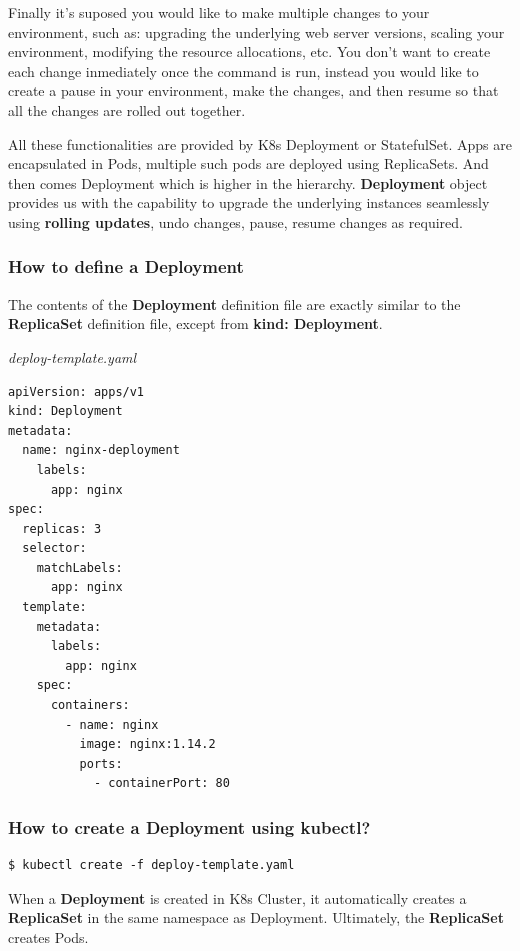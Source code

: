 \documentclass{article}
\newenvironment{blocktemplateII}[1]{%
    \tcolorbox[beamer,%
    noparskip,breakable,
    colframe=Green,%
    colbacklower=LimeGreen!75!LightGreen,%
    title=#1]}%
    {\endtcolorbox}
\newenvironment{codetemplate}[1][]{%
  \mybasecolorbox[#1]
  \itshape
}{%
  \endmybasecolorbox
}
\begin{document}
Finally it's suposed you would like to make multiple changes to your environment, such as: upgrading the underlying web server versions, scaling your environment, modifying the resource allocations, etc. You don't want to create each change inmediately once the command is run, instead you would like to create a pause in your environment, make the changes, and then resume so that all the changes are rolled out together.

All these functionalities are provided by K8s Deployment or StatefulSet. Apps are encapsulated in Pods, multiple such pods are deployed using ReplicaSets. And then comes Deployment which is higher in the hierarchy. \textbf{Deployment} object provides us with the capability to upgrade the underlying instances seamlessly using \textbf{rolling updates}, undo changes, pause, resume changes as required.

\subsubsection{How to define a Deployment}

The contents of the \textbf{Deployment} definition file are exactly similar to the \textbf{ReplicaSet} definition file, except from \textbf{kind: Deployment}.

\begin{codetemplate}{deploy-template.yaml}
\begin{verbatim}
apiVersion: apps/v1
kind: Deployment
metadata:
  name: nginx-deployment
    labels:
      app: nginx
spec:
  replicas: 3
  selector:
    matchLabels:
      app: nginx
  template:
    metadata:
      labels:
        app: nginx
    spec:
      containers:
        - name: nginx
          image: nginx:1.14.2
          ports:
            - containerPort: 80    
\end{verbatim}
\end{codetemplate}

\subsubsection{How to create a Deployment using kubectl?}

\begin{codetemplate}{}
\begin{verbatim}
$ kubectl create -f deploy-template.yaml
\end{verbatim}
\end{codetemplate}

\begin{blocktemplateII}{NOTE}
When a \textbf{Deployment} is created in K8s Cluster, it automatically creates a \textbf{ReplicaSet} in the same namespace as Deployment. Ultimately, the \textbf{ReplicaSet} creates Pods.
\end{blocktemplateII}
\end{document}
